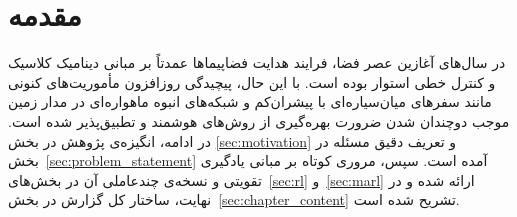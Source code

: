 \chapter{مقدمه}
\noindent 
در سال‌های آغازین عصر فضا، فرایند هدایت فضاپیماها عمدتاً بر مبانی دینامیک کلاسیک و کنترل خطی استوار بوده است. با این حال، پیچیدگی روزافزون مأموریت‌های کنونی مانند سفرهای میان‌سیاره‌ای با پیشران‌کم و شبکه‌های انبوه ماهواره‌ای در مدار زمین موجب دوچندان شدن ضرورت بهره‌گیری از روش‌های هوشمند و تطبیق‌پذیر شده‌ است.
\noindent
در ادامه، انگیزه‌ی پژوهش در بخش
\ref{sec:motivation}
 و تعریف دقیق مسئله در بخش~\ref{sec:problem_statement} آمده است. سپس، مروری کوتاه بر مبانی یادگیری تقویتی و نسخه‌ی چندعاملی آن در بخش‌های~\ref{sec:rl} و~\ref{sec:marl} ارائه شده و در نهایت، ساختار کل گزارش در بخش~\ref{sec:chapter_content} تشریح شده است.

  

  
  
  






